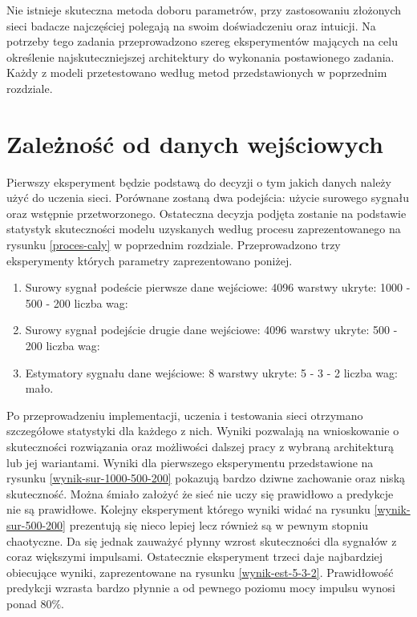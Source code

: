 \documentclass[inzynierska]{pwr_wmat_praca_dyplomowa}
\theoremstyle{plain}
\numberwithin{theorem}{chapter}
\theoremstyle{definition}
\numberwithin{theorem}{chapter}
\begin{document}
Nie istnieje skuteczna metoda doboru parametrów, przy zastosowaniu złożonych sieci badacze najczęściej polegają na swoim doświadczeniu oraz intuicji. Na potrzeby tego zadania przeprowadzono szereg eksperymentów mających na celu określenie najskuteczniejszej architektury do wykonania postawionego zadania. Każdy z modeli przetestowano według metod przedstawionych w poprzednim rozdziale. 

\section{Zależność od danych wejściowych}
Pierwszy eksperyment będzie podstawą do decyzji o tym jakich danych należy użyć do uczenia sieci. Porównane zostaną dwa podejścia: użycie surowego sygnału oraz wstępnie przetworzonego. Ostateczna decyzja podjęta zostanie na podstawie statystyk skuteczności modelu uzyskanych według procesu zaprezentowanego na rysunku \ref{proces-caly} w poprzednim rozdziale. Przeprowadzono trzy eksperymenty których parametry zaprezentowano poniżej.

\begin{enumerate}
	\item Surowy sygnał podeście pierwsze
	\subitem dane wejściowe: 4096
	\subitem warstwy ukryte: 1000 - 500 - 200
	\subitem liczba wag: 
	
	\item Surowy sygnał podejście drugie
	\subitem dane wejściowe: 4096
	\subitem warstwy ukryte: 500 - 200
	\subitem liczba wag:
	
	\item Estymatory sygnału
	\subitem dane wejściowe: 8
	\subitem warstwy ukryte: 5 - 3 - 2
	\subitem liczba wag: mało.
\end{enumerate}

Po przeprowadzeniu implementacji, uczenia i testowania sieci otrzymano szczegółowe statystyki dla każdego z nich. Wyniki pozwalają na wnioskowanie o skuteczności rozwiązania oraz możliwości dalszej pracy z wybraną architekturą lub jej wariantami. Wyniki dla pierwszego eksperymentu przedstawione na rysunku \ref{wynik-sur-1000-500-200} pokazują bardzo dziwne zachowanie oraz niską skuteczność. Można śmiało założyć że sieć nie uczy się prawidłowo a predykcje nie są prawidłowe. Kolejny eksperyment którego wyniki widać na rysunku \ref{wynik-sur-500-200} prezentują się nieco lepiej lecz również są w pewnym stopniu chaotyczne. Da się jednak zauważyć płynny wzrost skuteczności dla sygnałów z coraz większymi impulsami. Ostatecznie eksperyment trzeci daje najbardziej obiecujące wyniki, zaprezentowane na rysunku \ref{wynik-est-5-3-2}. Prawidłowość predykcji wzrasta bardzo płynnie a od pewnego poziomu mocy impulsu wynosi ponad $80\%$.
\end{document}
